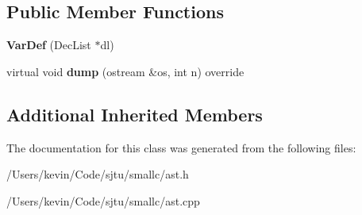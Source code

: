 \subsection*{Public Member Functions}
\begin{DoxyCompactItemize}
\item 
\mbox{\label{class_var_def_a84d598952d4bba93b5798b62001b679d}} 
{\bfseries Var\+Def} (Dec\+List $\ast$dl)
\item 
\mbox{\label{class_var_def_aab9d4538a24c88690974f1ed3ea1ab08}} 
virtual void {\bfseries dump} (ostream \&os, int n) override
\end{DoxyCompactItemize}
\subsection*{Additional Inherited Members}


The documentation for this class was generated from the following files\+:\begin{DoxyCompactItemize}
\item 
/\+Users/kevin/\+Code/sjtu/smallc/ast.\+h\item 
/\+Users/kevin/\+Code/sjtu/smallc/ast.\+cpp\end{DoxyCompactItemize}
